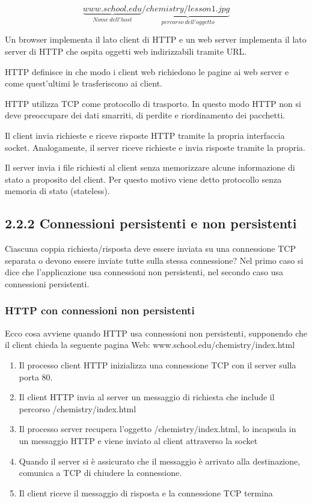 \documentclass{book}
\begin{document}
$$\underbrace{www.school.edu}_{Nome\ dell'host} / \underbrace{chemistry/lesson1.jpg}_{percorso\ dell'oggetto}$$

Un browser implementa il lato client di HTTP e un web server implementa il lato server di HTTP che ospita oggetti web indirizzabili tramite URL.

HTTP definisce in che modo i client web richiedono le pagine ai web server e come quest'ultimi le trasferiscono ai client.

HTTP utilizza TCP come protocollo di trasporto. In questo modo HTTP non si deve preoccupare dei dati smarriti, di perdite e riordinamento dei pacchetti.

Il client invia richieste e riceve risposte HTTP tramite la propria interfaccia socket. Analogamente, il server riceve richieste e invia risposte tramite la propria.

Il server invia i file richiesti al client senza memorizzare alcune informazione di stato a proposito del client. Per questo motivo viene detto protocollo senza memoria di stato (stateless).

\subsection*{2.2.2 Connessioni persistenti e non persistenti}
Ciascuna coppia richiesta/risposta deve essere inviata su una connessione TCP separata o devono essere inviate tutte sulla stessa connessione? Nel primo caso si dice che l'applicazione usa connessioni non persistenti, nel secondo caso usa connessioni persistenti.

\subsubsection*{HTTP con connessioni non persistenti}
Ecco cosa avviene quando HTTP usa connessioni non persistenti, supponendo che il client chieda la seguente pagina Web: www.school.edu/chemistry/index.html
\begin{enumerate}
	\item Il processo client HTTP inizializza una connessione TCP con il server sulla porta 80.
	\item Il client HTTP invia al server un messaggio di richiesta che include il percorso /chemistry/index.html
	\item Il processo server recupera l'oggetto /chemistry/index.html, lo incapsula in un messaggio HTTP e viene inviato al client attraverso la socket
	\item Quando il server si è assicurato che il messaggio è arrivato alla destinazione, comunica a TCP di chiudere la connessione.
	\item Il client riceve il messaggio di risposta e la connessione TCP termina
\end{enumerate}
\end{document}
